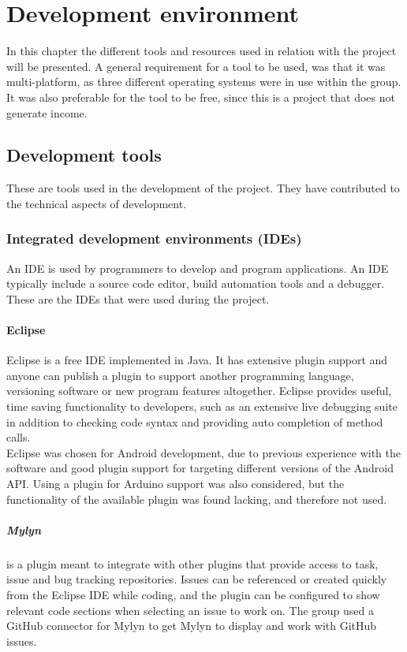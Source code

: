 \chapter{Development environment}
In this chapter the different tools and resources used in relation with the project will be presented. A general requirement for a tool to be used, was that it was multi-platform, as three different operating systems were in use within the group. It was also preferable for the tool to be free, since this is a project that does not generate income.

\section{Development tools}
These are tools used in the development of the project. They have contributed to the technical aspects of development.

\subsection{Integrated development environments (IDEs)}
An IDE is used by programmers to develop and program applications. An IDE typically include a source code editor, build automation tools and a debugger. These are the IDEs that were used during the project.

\subsubsection{Eclipse}
Eclipse is a free IDE implemented in Java. It has extensive plugin support and anyone can publish a plugin to support another programming language, versioning software or new program features altogether. Eclipse provides useful, time saving functionality to developers, such as an extensive live debugging suite in addition to checking code syntax and providing auto completion of method calls.\\
\newline
Eclipse was chosen for Android development, due to previous experience with the software and good plugin support for targeting different versions of the Android API. Using a plugin for Arduino support was also considered, but the functionality of the available plugin was found lacking, and therefore not used.

\paragraph{Mylyn} is a plugin meant to integrate with other plugins that provide access to task, issue and bug tracking repositories. Issues can be referenced or created quickly from the Eclipse IDE while coding, and the plugin can be configured to show relevant code sections when selecting an issue to work on. The group used a GitHub connector for Mylyn to get Mylyn to display and work with GitHub issues.


